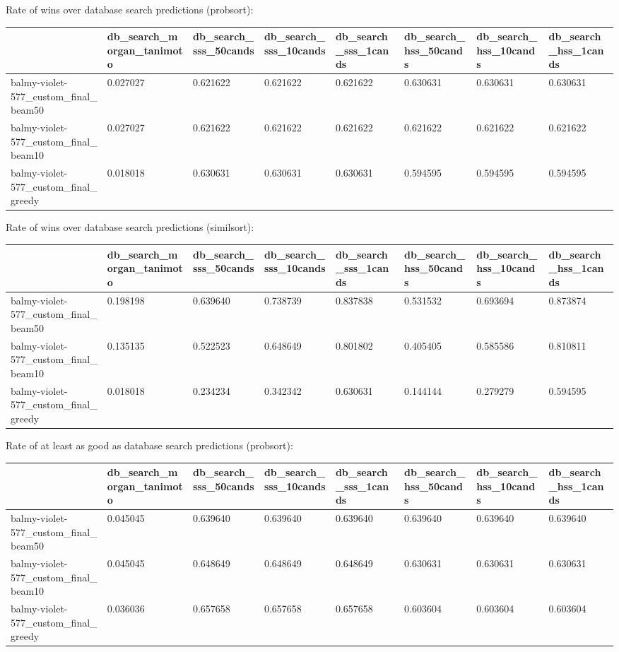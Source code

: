 Rate of wins over database search predictions (probsort):
\begin{tabular}{llllllll}
\toprule
 & db_search_morgan_tanimoto & db_search_sss_50cands & db_search_sss_10cands & db_search_sss_1cands & db_search_hss_50cands & db_search_hss_10cands & db_search_hss_1cands \\
\midrule
balmy-violet-577_custom_final_beam50 & 0.027027 & 0.621622 & 0.621622 & 0.621622 & 0.630631 & 0.630631 & 0.630631 \\
balmy-violet-577_custom_final_beam10 & 0.027027 & 0.621622 & 0.621622 & 0.621622 & 0.621622 & 0.621622 & 0.621622 \\
balmy-violet-577_custom_final_greedy & 0.018018 & 0.630631 & 0.630631 & 0.630631 & 0.594595 & 0.594595 & 0.594595 \\
\bottomrule
\end{tabular}



Rate of wins over database search predictions (similsort):
\begin{tabular}{llllllll}
\toprule
 & db_search_morgan_tanimoto & db_search_sss_50cands & db_search_sss_10cands & db_search_sss_1cands & db_search_hss_50cands & db_search_hss_10cands & db_search_hss_1cands \\
\midrule
balmy-violet-577_custom_final_beam50 & 0.198198 & 0.639640 & 0.738739 & 0.837838 & 0.531532 & 0.693694 & 0.873874 \\
balmy-violet-577_custom_final_beam10 & 0.135135 & 0.522523 & 0.648649 & 0.801802 & 0.405405 & 0.585586 & 0.810811 \\
balmy-violet-577_custom_final_greedy & 0.018018 & 0.234234 & 0.342342 & 0.630631 & 0.144144 & 0.279279 & 0.594595 \\
\bottomrule
\end{tabular}



Rate of at least as good as database search predictions (probsort):
\begin{tabular}{llllllll}
\toprule
 & db_search_morgan_tanimoto & db_search_sss_50cands & db_search_sss_10cands & db_search_sss_1cands & db_search_hss_50cands & db_search_hss_10cands & db_search_hss_1cands \\
\midrule
balmy-violet-577_custom_final_beam50 & 0.045045 & 0.639640 & 0.639640 & 0.639640 & 0.639640 & 0.639640 & 0.639640 \\
balmy-violet-577_custom_final_beam10 & 0.045045 & 0.648649 & 0.648649 & 0.648649 & 0.630631 & 0.630631 & 0.630631 \\
balmy-violet-577_custom_final_greedy & 0.036036 & 0.657658 & 0.657658 & 0.657658 & 0.603604 & 0.603604 & 0.603604 \\
\bottomrule
\end{tabular}



